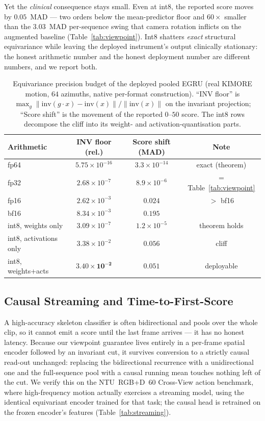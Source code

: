 \documentclass[10pt,journal]{IEEEtran}
\begin{document}
Yet the \emph{clinical} consequence stays small. Even at int8, the reported score moves by
$0.05$~MAD --- two orders below the mean-predictor floor and $60\times$ smaller than the $3.03$~MAD
per-sequence swing that camera rotation inflicts on the augmented baseline (Table~\ref{tab:viewpoint}).
Int8 shatters \emph{exact} structural equivariance while leaving the deployed instrument's output
clinically stationary: the honest arithmetic number and the honest deployment number are different
numbers, and we report both.

\begin{table}[!t]
\centering
\caption{Equivariance precision budget of the deployed pooled EGRU (real KIMORE motion, $64$
azimuths, native per-format construction). ``INV floor'' is
$\max_g\lVert\mathrm{inv}(g\cdot x)-\mathrm{inv}(x)\rVert/\lVert\mathrm{inv}(x)\rVert$ on the
invariant projection; ``Score shift'' is the movement of the reported $0$--$50$ score. The int8 rows
decompose the cliff into its weight- and activation-quantisation parts.}
\label{tab:precision}
\scriptsize
\setlength{\tabcolsep}{4pt}
\begin{tabular}{lccc}
\toprule
Arithmetic & INV floor (rel.) & Score shift (MAD) & Note \\
\midrule
fp64 & $5.75\times10^{-16}$ & $3.3\times10^{-14}$ & exact (theorem) \\
fp32 & $2.68\times10^{-7}$  & $8.9\times10^{-6}$  & = Table~\ref{tab:viewpoint} \\
fp16 & $2.62\times10^{-3}$  & $0.024$             & $>$ bf16 \\
bf16 & $8.34\times10^{-3}$  & $0.195$             & \\
\midrule
int8, weights only      & $3.09\times10^{-7}$ & $1.2\times10^{-5}$ & theorem holds \\
int8, activations only  & $3.38\times10^{-2}$ & $0.056$           & cliff \\
int8, weights+acts      & $\mathbf{3.40\times10^{-2}}$ & $\mathbf{0.051}$ & deployable \\
\bottomrule
\end{tabular}
\end{table}

\subsection{Causal Streaming and Time-to-First-Score}
\label{sec:deploy:streaming}

A high-accuracy skeleton classifier is often bidirectional and pools over the whole clip, so it
cannot emit a score until the last frame arrives --- it has no honest latency. Because our viewpoint
guarantee lives entirely in a per-frame spatial encoder followed by an invariant cut, it survives
conversion to a strictly causal read-out unchanged: replacing the bidirectional recurrence with a
unidirectional one and the full-sequence pool with a causal running mean touches nothing left of the
cut. We verify this on the NTU~RGB+D~$60$ Cross-View action benchmark, where high-frequency motion
actually exercises a streaming model, using the identical equivariant encoder trained for that task;
the causal head is retrained on the frozen encoder's features (Table~\ref{tab:streaming}).
\end{document}
